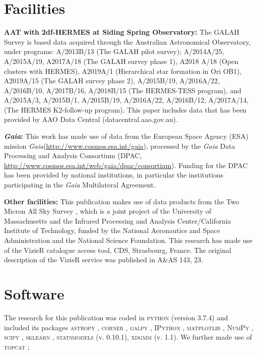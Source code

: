 \documentclass[fleqn,usenatbib]{mnras}
\newcommand{\Gaia}{\textit{Gaia}\xspace} %
\begin{document}
\section*{Facilities}

\textbf{AAT with 2df-HERMES at Siding Spring Observatory:}
The GALAH Survey is based  data acquired through the Australian Astronomical Observatory, under programs: A/2013B/13 (The GALAH pilot survey); A/2014A/25, A/2015A/19, A2017A/18 (The GALAH survey phase 1), A2018 A/18 (Open clusters with HERMES), A2019A/1 (Hierarchical star formation in Ori OB1),  A2019A/15 (The GALAH survey phase 2), A/2015B/19, A/2016A/22, A/2016B/10, A/2017B/16, A/2018B/15 (The HERMES-TESS program), and A/2015A/3, A/2015B/1, A/2015B/19, A/2016A/22, A/2016B/12, A/2017A/14, (The HERMES K2-follow-up program). This paper includes data that has been provided by AAO Data Central (datacentral.aao.gov.au).

\textbf{\Gaia: } This work has made use of data from the European Space Agency (ESA) mission \Gaia (\url{http://www.cosmos.esa.int/gaia}), processed by the \Gaia Data Processing and Analysis Consortium (DPAC, \url{http://www.cosmos.esa.int/web/gaia/dpac/consortium}). Funding for the DPAC has been provided by national institutions, in particular the institutions participating in the \Gaia Multilateral Agreement. 

\textbf{Other facilities:} This publication makes use of data products from the Two Micron All Sky Survey \citep{Skrutskie2006}, which is a joint project of the University of Massachusetts and the Infrared Processing and Analysis Center/California Institute of Technology, funded by the National Aeronautics and Space Administration and the National Science Foundation. This research has made use of the VizieR catalogue access tool, CDS, Strasbourg, France. The original description of the VizieR service was published in A\&AS 143, 23.

\section*{Software}

The research for this publication was coded in \textsc{python} (version 3.7.4) and included its packages
\textsc{astropy} \citep[v. 3.2.2;][]{Robitaille2013,PriceWhelan2018},
\textsc{corner} \citep[v. 2.0.1;][]{corner},
\textsc{galpy} \citep[version 1.6.0;][]{Bovy2015},
\textsc{IPython} \citep[v. 7.8.0;][]{ipython},
\textsc{matplotlib} \citep[v. 3.1.3;][]{matplotlib},
\textsc{NumPy} \citep[v. 1.17.2;][]{numpy},
\textsc{scipy} \citep[version 1.3.1;][]{scipy},
\textsc{sklearn} \citep[v. 0.21.3;][]{scikit-learn},
\textsc{statsmodels} (v. 0.10.1),
\textsc{xdgmm} (v. 1.1).
We further made use of \textsc{topcat} \citep[version 4.7;][]{Taylor2005};
\end{document}
